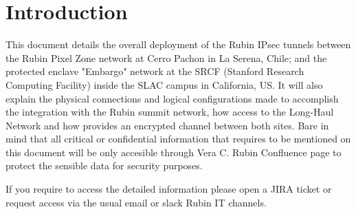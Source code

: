 \section{Introduction}

This document details the overall deployment of the Rubin IPsec tunnels between the Rubin Pixel Zone network at Cerro Pachon in La Serena, Chile; and the protected enclave "Embargo" network at the SRCF (Stanford Research Computing Facility) inside the SLAC campus in California, US. 
It will also explain the physical connections and logical configurations made to accomplish the integration with the Rubin summit network, how access to the Long-Haul Network and how provides an encrypted channel between both sites. Bare in mind that all critical or confidential information that requires to be mentioned on this document will be only accesible through Vera C. Rubin Confluence page to protect the sensible data for security purposes.

If you require to access the detailed information please open a JIRA ticket or request access via the usual email or slack Rubin IT channels.